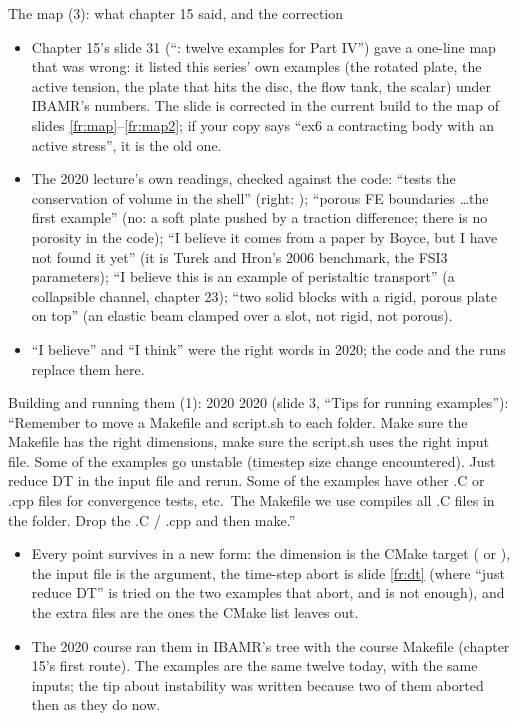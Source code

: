 \documentclass[aspectratio=169,11pt]{beamer}
\begin{document}
\begin{frame}{The map (3): what chapter 15 said, and the correction}
\label{fr:correction}
\footnotesize
\begin{itemize}
  \item Chapter 15's slide 31 (``: twelve examples for Part IV'') gave a one-line map that was wrong: it listed this series' own examples (the rotated plate, the active tension, the plate that hits the disc, the flow tank, the scalar) under IBAMR's numbers. The slide is corrected in the current build to the map of slides \ref{fr:map}--\ref{fr:map2}; if your copy says ``ex6 a contracting body with an active stress'', it is the old one.
  \item The 2020 lecture's own readings, checked against the code:  ``tests the conservation of volume in the shell'' (right: );  ``porous FE boundaries \ldots the first example'' (no: a soft plate pushed by a traction difference; there is no porosity in the code);  ``I believe it comes from a paper by Boyce, but I have not found it yet'' (it is Turek and Hron's 2006 benchmark, the FSI3 parameters);  ``I believe this is an example of peristaltic transport'' (a collapsible channel, chapter 23);  ``two solid blocks with a rigid, porous plate on top'' (an elastic beam clamped over a slot, not rigid, not porous).
  \item ``I believe'' and ``I think'' were the right words in 2020; the code and the runs replace them here.
\end{itemize}
\end{frame}

\begin{frame}{Building and running them (1): 2020}
\label{fr:build2020}
\footnotesize
2020 (slide 3, ``Tips for running examples''): ``Remember to move a Makefile and script.sh to each folder. Make sure the Makefile has the right dimensions, make sure the script.sh uses the right input file. Some of the examples go unstable (timestep size change encountered). Just reduce DT in the input file and rerun. Some of the examples have other .C or .cpp files for convergence tests, etc.\ The Makefile we use compiles all .C files in the folder. Drop the .C / .cpp and then make.''
\begin{itemize}
  \item Every point survives in a new form: the dimension is the CMake target ( or ), the input file is the argument, the time-step abort is slide \ref{fr:dt} (where ``just reduce DT'' is tried on the two examples that abort, and is not enough), and the extra files are the ones the CMake list leaves out.
  \item The 2020 course ran them in IBAMR's tree with the course Makefile (chapter 15's first route). The examples are the same twelve today, with the same inputs; the tip about instability was written because two of them aborted then as they do now.
\end{itemize}
\end{frame}
\end{document}

